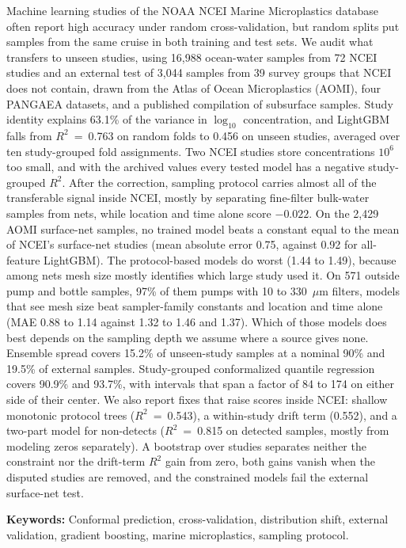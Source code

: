 \documentclass[12pt,a4paper]{report}
\newcommand{\Rsq}{$R^2$}
\begin{document}
Machine learning studies of the NOAA NCEI Marine Microplastics database often report high accuracy under random cross-validation, but random splits put samples from the same cruise in both training and test sets. We audit what transfers to unseen studies, using 16,988 ocean-water samples from 72 NCEI studies and an external test of 3,044 samples from 39 survey groups that NCEI does not contain, drawn from the Atlas of Ocean Microplastics (AOMI), four PANGAEA datasets, and a published compilation of subsurface samples. Study identity explains 63.1\% of the variance in $\log_{10}$ concentration, and LightGBM falls from \Rsq{}~=~0.763 on random folds to 0.456 on unseen studies, averaged over ten study-grouped fold assignments. Two NCEI studies store concentrations $10^6$ too small, and with the archived values every tested model has a negative study-grouped \Rsq{}. After the correction, sampling protocol carries almost all of the transferable signal inside NCEI, mostly by separating fine-filter bulk-water samples from nets, while location and time alone score $-0.022$. On the 2,429 AOMI surface-net samples, no trained model beats a constant equal to the mean of NCEI's surface-net studies (mean absolute error 0.75, against 0.92 for all-feature LightGBM). The protocol-based models do worst (1.44 to 1.49), because among nets mesh size mostly identifies which large study used it. On 571 outside pump and bottle samples, 97\% of them pumps with 10 to 330~$\mu$m filters, models that see mesh size beat sampler-family constants and location and time alone (MAE 0.88 to 1.14 against 1.32 to 1.46 and 1.37). Which of those models does best depends on the sampling depth we assume where a source gives none. Ensemble spread covers 15.2\% of unseen-study samples at a nominal 90\% and 19.5\% of external samples. Study-grouped conformalized quantile regression covers 90.9\% and 93.7\%, with intervals that span a factor of 84 to 174 on either side of their center. We also report fixes that raise scores inside NCEI: shallow monotonic protocol trees (\Rsq{}~=~0.543), a within-study drift term (0.552), and a two-part model for non-detects (\Rsq{}~=~0.815 on detected samples, mostly from modeling zeros separately). A bootstrap over studies separates neither the constraint nor the drift-term \Rsq{} gain from zero, both gains vanish when the disputed studies are removed, and the constrained models fail the external surface-net test.

\textbf{Keywords:} Conformal prediction, cross-validation, distribution shift, external validation, gradient boosting, marine microplastics, sampling protocol.
\end{document}
